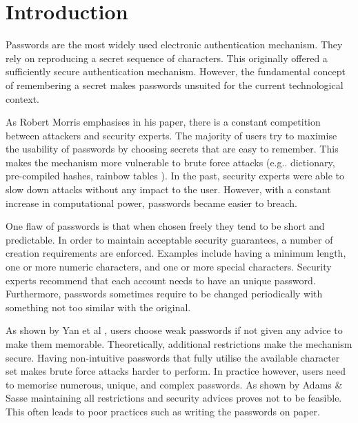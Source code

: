 
\chapter{Introduction} %

\label{Chapter1}


Passwords are the most widely used electronic authentication mechanism. They rely on reproducing a secret sequence of characters. This originally offered a sufficiently secure authentication mechanism. However, the fundamental concept of remembering a secret makes passwords unsuited for the current technological context. 

As Robert Morris \cite{morris1979password} emphasises in his paper, there is a constant competition between attackers and security experts. The majority of users try to maximise the usability of passwords by choosing secrets that are easy to remember. This makes the mechanism more vulnerable to brute force attacks (e.g.. dictionary, pre-compiled hashes, rainbow tables \cite{oechslin2003making}). In the past, security experts were able to slow down attacks without any impact to the user. However, with a constant increase in computational power, passwords became easier to breach. 

One flaw of passwords is that when chosen freely they tend to be short and predictable. In order to maintain acceptable security guarantees, a number of creation requirements are enforced. Examples include having a minimum length, one or more numeric characters, and one or more special characters. Security experts recommend that each account needs to have an unique password. Furthermore, passwords sometimes require to be changed periodically with something not too similar with the original. 

As shown by Yan et al \cite{yan2004password}, users choose weak passwords if not given any advice to make them memorable. Theoretically, additional restrictions make the mechanism secure. Having non-intuitive passwords that fully utilise the available character set makes brute force attacks harder to perform. In practice however, users need to memorise numerous, unique, and complex passwords. As shown by Adams \& Sasse \cite{adams1999users} maintaining all restrictions and security advices proves not to be feasible. This often leads to poor practices such as writing the passwords on paper.

